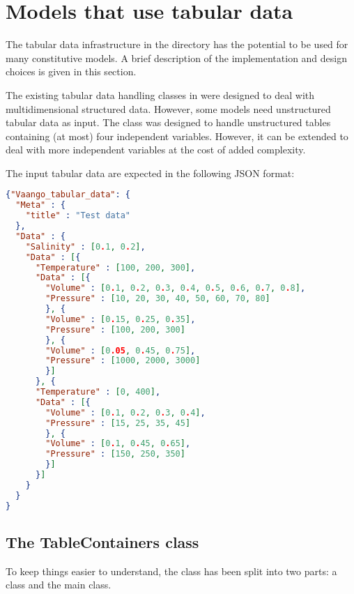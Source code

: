 \section{Models that use tabular data}
The tabular data infrastructure in the  directory has the 
potential to be used for many constitutive models.  A brief description
of the implementation and design choices is given in this section.

The existing tabular data handling classes in \Vaango were designed to
deal with multidimensional structured data.  However, some \MPM models
need unstructured tabular data as input.  The 
class was designed to handle unstructured tables containing (at most)
four independent variables.  However, it can be extended to deal
with more independent variables at the cost of added complexity.

The input tabular data are expected in the following JSON format:

\begin{lstlisting}[language=JSON]
{"Vaango_tabular_data": {
  "Meta" : {
    "title" : "Test data"
  },
  "Data" : {
    "Salinity" : [0.1, 0.2],
    "Data" : [{
      "Temperature" : [100, 200, 300],
      "Data" : [{
        "Volume" : [0.1, 0.2, 0.3, 0.4, 0.5, 0.6, 0.7, 0.8],
        "Pressure" : [10, 20, 30, 40, 50, 60, 70, 80]
        }, {
        "Volume" : [0.15, 0.25, 0.35],
        "Pressure" : [100, 200, 300]
        }, {
        "Volume" : [0.05, 0.45, 0.75],
        "Pressure" : [1000, 2000, 3000]
        }] 
      }, {
      "Temperature" : [0, 400],
      "Data" : [{
        "Volume" : [0.1, 0.2, 0.3, 0.4],
        "Pressure" : [15, 25, 35, 45]
        }, {
        "Volume" : [0.1, 0.45, 0.65],
        "Pressure" : [150, 250, 350]
        }]
      }]
    }
  }
}
\end{lstlisting}

\subsection{The TableContainers class}
To keep things easier to understand, the  class has been
split into two parts: a  class and the main 
class.

